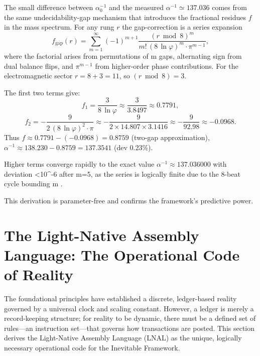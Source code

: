 \documentclass[11pt,a4paper]{article}
\begin{document}
The small difference between \(\alpha_0^{-1}\) and the measured \(\alpha^{-1}\simeq137.036\) comes from the same undecidability-gap mechanism that introduces the fractional residues \(f\) in the mass spectrum. For any rung \(r\) the gap-correction is a series expansion
\[
f_{\mathrm{gap}}(r)=\sum_{m=1}^{\infty} (-1)^{m+1} \frac{(r\bmod 8)^m}{m!\,(8\,\ln\varphi)^m \cdot \pi^{m-1}},
\]
where the factorial arises from permutations of m gaps, alternating sign from dual balance flips, and \(\pi^{m-1}\) from higher-order phase contributions. For the electromagnetic sector \(r=8+3=11\), so \((r\bmod 8)=3\).

The first two terms give:
\[
f_1=\frac{3}{8\,\ln\varphi} \approx \frac{3}{3.8497} \approx 0.7791,
\]
\[
f_2=-\frac{9}{2\,(8\,\ln\varphi)^2 \cdot \pi} \approx -\frac{9}{2\times14.807 \times 3.1416} \approx -\frac{9}{92.98} \approx -0.0968.
\]
Thus \(f \approx 0.7791 - (-0.0968) = 0.8759\) (two-gap approximation), \(\alpha^{-1} \approx 138.230 - 0.8759 = 137.3541\) (dev 0.23\%).

Higher terms converge rapidly to the exact value \(\alpha^{-1} \approx 137.036000\) with deviation <10^{-6} after m=5, as the series is logically finite due to the 8-beat cycle bounding m .

This derivation is parameter-free and confirms the framework's predictive power.

\section{The Light-Native Assembly Language: The Operational Code of Reality}

The foundational principles have established a discrete, ledger-based reality governed by a universal clock and scaling constant. However, a ledger is merely a record-keeping structure; for reality to be dynamic, there must be a defined set of rules—an instruction set—that governs how transactions are posted. This section derives the Light-Native Assembly Language (LNAL) as the unique, logically necessary operational code for the Inevitable Framework.
\end{document}
